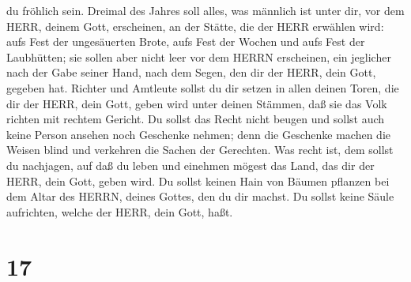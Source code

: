 du fröhlich sein.  Dreimal des Jahres soll alles, was
männlich ist unter dir, vor dem HERR, deinem Gott, erscheinen, an der
Stätte, die der HERR erwählen wird: aufs Fest der ungesäuerten Brote,
aufs Fest der Wochen und aufs Fest der Laubhütten; sie sollen aber nicht
leer vor dem HERRN erscheinen,  ein jeglicher nach der Gabe
seiner Hand, nach dem Segen, den dir der HERR, dein Gott, gegeben hat.
 Richter und Amtleute sollst du dir setzen in allen deinen
Toren, die dir der HERR, dein Gott, geben wird unter deinen Stämmen, daß
sie das Volk richten mit rechtem Gericht.  Du sollst das
Recht nicht beugen und sollst auch keine Person ansehen noch Geschenke
nehmen; denn die Geschenke machen die Weisen blind und verkehren die
Sachen der Gerechten.  Was recht ist, dem sollst du
nachjagen, auf daß du leben und einehmen mögest das Land, das dir der
HERR, dein Gott, geben wird.  Du sollst keinen Hain von
Bäumen pflanzen bei dem Altar des HERRN, deines Gottes, den du dir
machst.  Du sollst keine Säule aufrichten, welche der HERR,
dein Gott, haßt.

\hypertarget{section-16}{%
\section{17}\label{section-16}}

